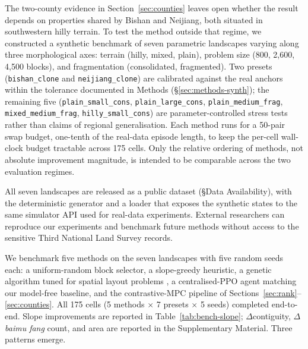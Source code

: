 \documentclass[11pt]{article}
\begin{document}
The two-county evidence in Section~\ref{sec:counties} leaves open whether the result depends on properties shared by Bishan and Neijiang, both situated in southwestern hilly terrain. To test the method outside that regime, we constructed a synthetic benchmark of seven parametric landscapes varying along three morphological axes: terrain (hilly, mixed, plain), problem size (800, 2{,}600, 4{,}500 blocks), and fragmentation (consolidated, fragmented). Two presets (\texttt{bishan\_clone} and \texttt{neijiang\_clone}) are calibrated against the real anchors within the tolerance documented in Methods (\S\ref{sec:methods-synth}); the remaining five (\texttt{plain\_small\_cons}, \texttt{plain\_large\_cons}, \texttt{plain\_medium\_frag}, \texttt{mixed\_medium\_frag}, \texttt{hilly\_small\_cons}) are parameter-controlled stress tests rather than claims of regional generalisation. Each method runs for a 50-pair swap budget, one-tenth of the real-data episode length, to keep the per-cell wall-clock budget tractable across 175 cells. Only the relative ordering of methods, not absolute improvement magnitude, is intended to be comparable across the two evaluation regimes.

All seven landscapes are released as a public dataset (\S Data Availability), with the deterministic generator and a loader that exposes the synthetic states to the same simulator API used for real-data experiments. External researchers can reproduce our experiments and benchmark future methods without access to the sensitive Third National Land Survey records.

We benchmark five methods on the seven landscapes with five random seeds each: a uniform-random block selector, a slope-greedy heuristic, a genetic algorithm tuned for spatial layout problems \citep{cao2012boundary}, a centralised-PPO agent matching our model-free baseline, and the contrastive-MPC pipeline of Sections~\ref{sec:rank}--\ref{sec:counties}. All 175 cells (5 methods $\times$ 7 presets $\times$ 5 seeds) completed end-to-end. Slope improvements are reported in Table~\ref{tab:bench-slope}; $\Delta$contiguity, $\Delta$\textit{baimu fang} count, and area are reported in the Supplementary Material. Three patterns emerge.
\end{document}
